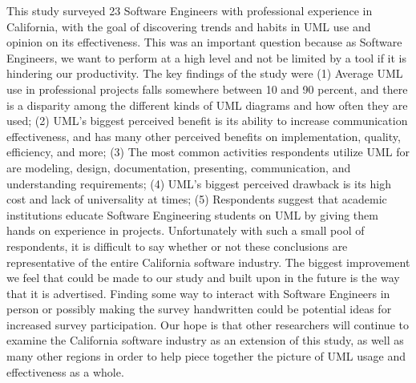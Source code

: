 \documentclass[letterpaper, 10 pt, conference]{ieeeconf}  %
\begin{document}
This study surveyed 23 Software Engineers with professional experience in California, with the goal of discovering trends and habits in UML use and opinion on its effectiveness. This was an important question because as Software Engineers, we want to perform at a high level and not be limited by a tool if it is hindering our productivity. The key findings of the study were (1) Average UML use in professional projects falls somewhere between 10 and 90 percent, and there is a disparity among the different kinds of UML diagrams and how often they are used; (2) UML's biggest perceived benefit is its ability to increase communication effectiveness, and has many other perceived benefits on implementation, quality, efficiency, and more; (3) The most common activities respondents utilize UML for are  modeling, design, documentation, presenting, communication, and understanding requirements; (4) UML's biggest perceived drawback is its high cost and lack of universality at times; (5) Respondents suggest that academic institutions educate Software Engineering students on UML by giving them hands on experience in projects. Unfortunately with such a small pool of respondents, it is difficult to say whether or not these conclusions are representative of the entire California software industry. The biggest improvement we feel that could be made to our study and built upon in the future is the way that it is advertised. Finding some way to interact with Software Engineers in person or possibly making the survey handwritten could be potential ideas for increased survey participation. Our hope is that other researchers will continue to examine the California software industry as an extension of this study, as well as many other regions in order to help piece together the picture of UML usage and effectiveness as a whole. 

\addtolength{\textheight}{-12cm}   %








\nocite{*}


\end{document}
